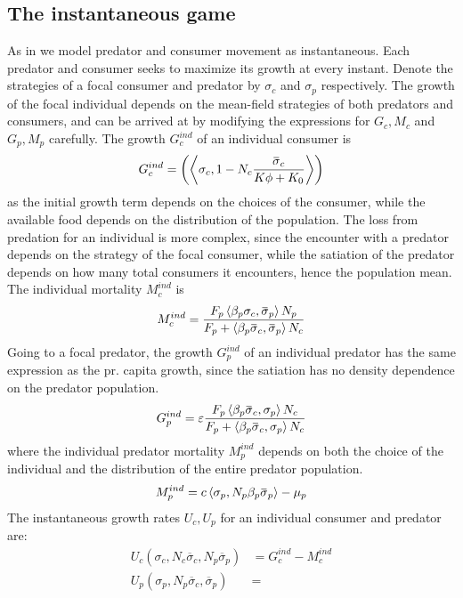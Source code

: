 \subsection{The instantaneous game}
As in  we model predator and consumer movement as instantaneous. Each predator and consumer seeks to maximize its growth at every instant. Denote the strategies of a focal consumer and predator by $\sigma_c$ and $\sigma_p$ respectively.  The growth of the focal individual depends on the mean-field strategies of both predators and consumers, and can be arrived at by modifying the expressions for $G_c,M_c$ and $G_p, M_p$ carefully.
The growth $G_c^{ind}$ of an individual consumer is
\begin{equation}
  G_c^{ind} = \pa{\ip{\sigma_c}{1-N_c \frac{\overbar{\sigma}_c}{K\phi + K_0}}}
\end{equation}
as the initial growth term depends on the choices of the consumer, while the available food depends on the distribution of the population. The loss from predation for an individual is more complex, since the encounter with a predator depends on the strategy of the focal consumer, while the satiation of the predator depends on how many total consumers it encounters, hence the population mean. The individual mortality $M_c^{ind}$ is
\begin{equation}
  M_c^{ind} =  \frac{F_p \ip{\beta_p \sigma_c}{\overbar{\sigma}_p} N_p}{F_p + \ip{\beta_p \overbar{\sigma}_c}{\overbar{\sigma}_p} N_c}
\end{equation}
Going to a focal predator, the growth $G_p^{ind}$ of an individual predator has the same expression as the pr. capita growth, since the satiation has no density dependence on the predator population.
\begin{equation}
  G_p^{ind} = \epsilon \frac{F_p \ip{\beta_p \overbar{\sigma}_c}{\sigma_p} N_c}{F_p + \ip{\beta_p \overbar{\sigma}_c}{\sigma_p} N_c}
\end{equation}
where the individual predator mortality $M_p^{ind}$ depends on both the choice of the individual and the distribution of the entire predator population.
\begin{equation}
  M_p^{ind} =  c \ip{\sigma_p}{N_p\beta_p \overbar{\sigma}_p}  - \mu_p
\end{equation}
The instantaneous growth rates $U_c,U_p$ for an individual consumer and predator are:
\begin{align}
  U_c(\sigma_c, N_c \overbar{\sigma}_c, N_p\overbar{\sigma}_p) &=  G_c^{ind} - M_c^{ind} \\
  U_p(\sigma_p, N_p \overbar{\sigma}_c, \overbar{\sigma}_p) &=
\end{align}
